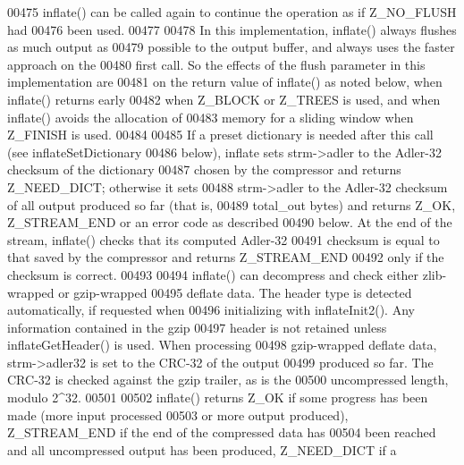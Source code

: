 \begin{DoxyCode}
00475 \textcolor{comment}{  inflate() can be called again to continue the operation as if Z\_NO\_FLUSH had}
00476 \textcolor{comment}{  been used.}
00477 \textcolor{comment}{}
00478 \textcolor{comment}{     In this implementation, inflate() always flushes as much output as}
00479 \textcolor{comment}{  possible to the output buffer, and always uses the faster approach on the}
00480 \textcolor{comment}{  first call.  So the effects of the flush parameter in this implementation are}
00481 \textcolor{comment}{  on the return value of inflate() as noted below, when inflate() returns early}
00482 \textcolor{comment}{  when Z\_BLOCK or Z\_TREES is used, and when inflate() avoids the allocation of}
00483 \textcolor{comment}{  memory for a sliding window when Z\_FINISH is used.}
00484 \textcolor{comment}{}
00485 \textcolor{comment}{     If a preset dictionary is needed after this call (see inflateSetDictionary}
00486 \textcolor{comment}{  below), inflate sets strm->adler to the Adler-32 checksum of the dictionary}
00487 \textcolor{comment}{  chosen by the compressor and returns Z\_NEED\_DICT; otherwise it sets}
00488 \textcolor{comment}{  strm->adler to the Adler-32 checksum of all output produced so far (that is,}
00489 \textcolor{comment}{  total\_out bytes) and returns Z\_OK, Z\_STREAM\_END or an error code as described}
00490 \textcolor{comment}{  below.  At the end of the stream, inflate() checks that its computed Adler-32}
00491 \textcolor{comment}{  checksum is equal to that saved by the compressor and returns Z\_STREAM\_END}
00492 \textcolor{comment}{  only if the checksum is correct.}
00493 \textcolor{comment}{}
00494 \textcolor{comment}{    inflate() can decompress and check either zlib-wrapped or gzip-wrapped}
00495 \textcolor{comment}{  deflate data.  The header type is detected automatically, if requested when}
00496 \textcolor{comment}{  initializing with inflateInit2().  Any information contained in the gzip}
00497 \textcolor{comment}{  header is not retained unless inflateGetHeader() is used.  When processing}
00498 \textcolor{comment}{  gzip-wrapped deflate data, strm->adler32 is set to the CRC-32 of the output}
00499 \textcolor{comment}{  produced so far.  The CRC-32 is checked against the gzip trailer, as is the}
00500 \textcolor{comment}{  uncompressed length, modulo 2^32.}
00501 \textcolor{comment}{}
00502 \textcolor{comment}{    inflate() returns Z\_OK if some progress has been made (more input processed}
00503 \textcolor{comment}{  or more output produced), Z\_STREAM\_END if the end of the compressed data has}
00504 \textcolor{comment}{  been reached and all uncompressed output has been produced, Z\_NEED\_DICT if a}

\end{DoxyCode}
